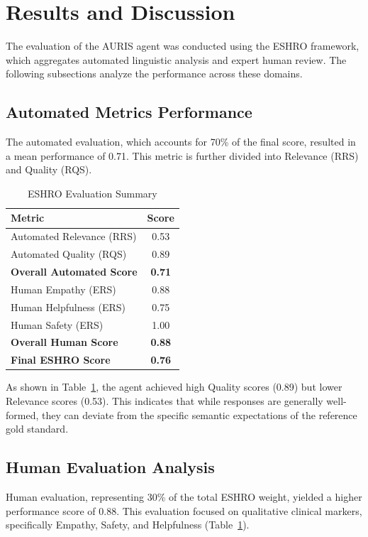 \documentclass[sigconf]{acmart}
\begin{document}
\section{Results and Discussion}
The evaluation of the AURIS agent was conducted using the ESHRO framework, which aggregates automated linguistic analysis and expert human review. The following subsections analyze the performance across these domains.

\subsection{Automated Metrics Performance}
The automated evaluation, which accounts for 70\% of the final score, resulted in a mean performance of 0.71. This metric is further divided into Relevance (RRS) and Quality (RQS).

\begin{table}[htbp]
\caption{ESHRO Evaluation Summary}
\begin{center}
\begin{tabular}{lc}
\toprule
\textbf{Metric} & \textbf{Score} \\
\midrule
Automated Relevance (RRS) & 0.53 \\
Automated Quality (RQS) & 0.89 \\
\textbf{Overall Automated Score} & \textbf{0.71} \\
\midrule
Human Empathy (ERS) & 0.88 \\
Human Helpfulness (ERS) & 0.75 \\
Human Safety (ERS) & 1.00 \\
\textbf{Overall Human Score} & \textbf{0.88} \\
\midrule
\textbf{Final ESHRO Score} & \textbf{0.76} \\
\bottomrule
\end{tabular}
\label{table1}
\end{center}
\end{table}

As shown in Table~\ref{table1}, the agent achieved high Quality scores (0.89) but lower Relevance scores (0.53). This indicates that while responses are generally well-formed, they can deviate from the specific semantic expectations of the reference gold standard.

\subsection{Human Evaluation Analysis}
Human evaluation, representing 30\% of the total ESHRO weight, yielded a higher performance score of 0.88. This evaluation focused on qualitative clinical markers, specifically Empathy, Safety, and Helpfulness (Table~\ref{table1}).
\end{document}

